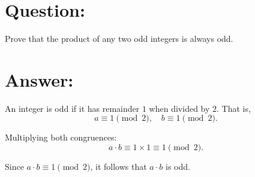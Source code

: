 \documentclass{article}
\begin{document}
\section{Question:}

Prove that the product of any two odd integers is always odd.

\section{Answer:}

An integer is odd if it has remainder $1$ when divided by $2$. That is,
\begin{equation}
    a \equiv 1 \pmod{2}, \quad b \equiv 1 \pmod{2}.
\end{equation}

Multiplying both congruences:
\begin{equation}
    a \cdot b \equiv 1 \times 1 \equiv 1 \pmod{2}.
\end{equation}

Since $a \cdot b \equiv 1 \pmod{2}$, it follows that $a \cdot b$ is odd.
\end{document}
